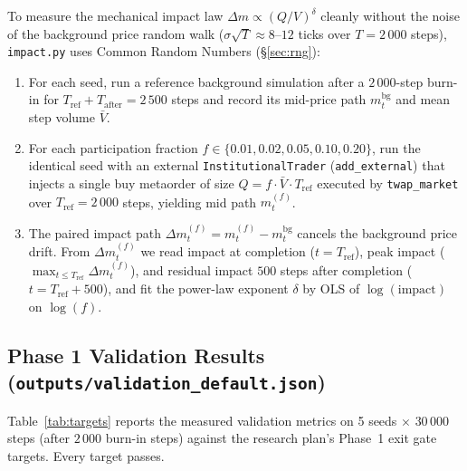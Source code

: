 \documentclass[11pt,a4paper]{article}
\newcommand{\code}[1]{\texttt{#1}}
\begin{document}
To measure the mechanical impact law $\Delta m \propto (Q/V)^\delta$ cleanly without the noise of the
background price random walk ($\sigma \sqrt{T} \approx 8$--$12$ ticks over $T=2\,000$ steps),
\code{impact.py} uses Common Random Numbers (\S\ref{sec:rng}):
\begin{enumerate}[nosep]
\item For each seed, run a reference background simulation after a $2\,000$-step burn-in for
  $T_{\text{ref}} + T_{\text{after}} = 2\,500$ steps and record its mid-price path $m^{\text{bg}}_t$ and
  mean step volume $\bar V$.
\item For each participation fraction $f \in \{0.01, 0.02, 0.05, 0.10, 0.20\}$, run the identical seed
  with an external \code{InstitutionalTrader} (\code{add\_external}) that injects a single buy metaorder
  of size $Q = f \cdot \bar V \cdot T_{\text{ref}}$ executed by \code{twap\_market} over $T_{\text{ref}} =
  2\,000$ steps, yielding mid path $m^{(f)}_t$.
\item The paired impact path $\Delta m^{(f)}_t = m^{(f)}_t - m^{\text{bg}}_t$ cancels the background
  price drift. From $\Delta m^{(f)}_t$ we read impact at completion ($t = T_{\text{ref}}$), peak impact
  ($\max_{t \le T_{\text{ref}}} \Delta m^{(f)}_t$), and residual impact $500$ steps after completion
  ($t = T_{\text{ref}} + 500$), and fit the power-law exponent $\delta$ by OLS of $\log(\text{impact})$
  on $\log(f)$.
\end{enumerate}

\subsection{Phase 1 Validation Results (\code{outputs/validation\_default.json})}

Table~\ref{tab:targets} reports the measured validation metrics on 5 seeds $\times$ $30\,000$ steps
(after $2\,000$ burn-in steps) against the research plan's Phase~1 exit gate targets. Every target passes.
\end{document}
